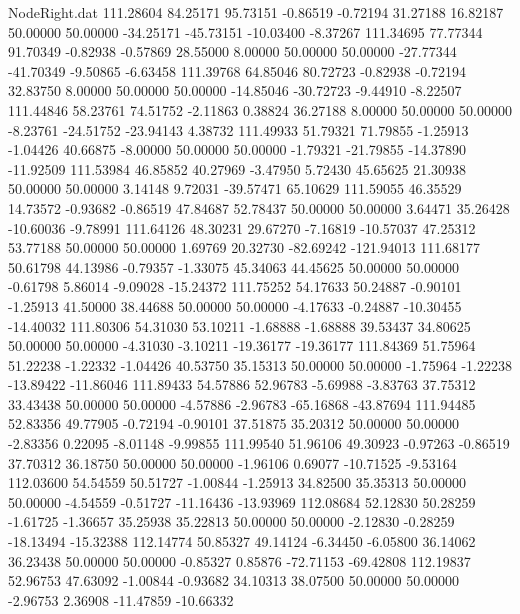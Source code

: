 \begin{filecontents}{NodeRight.dat}
 111.28604   84.25171   95.73151    -0.86519   -0.72194   31.27188   16.82187   50.00000   50.00000  -34.25171  -45.73151  -10.03400   -8.37267
 111.34695   77.77344   91.70349    -0.82938   -0.57869   28.55000    8.00000   50.00000   50.00000  -27.77344  -41.70349   -9.50865   -6.63458
 111.39768   64.85046   80.72723    -0.82938   -0.72194   32.83750    8.00000   50.00000   50.00000  -14.85046  -30.72723   -9.44910   -8.22507
 111.44846   58.23761   74.51752    -2.11863    0.38824   36.27188    8.00000   50.00000   50.00000   -8.23761  -24.51752  -23.94143    4.38732
 111.49933   51.79321   71.79855    -1.25913   -1.04426   40.66875   -8.00000   50.00000   50.00000   -1.79321  -21.79855  -14.37890  -11.92509
 111.53984   46.85852   40.27969    -3.47950    5.72430   45.65625   21.30938   50.00000   50.00000    3.14148    9.72031  -39.57471   65.10629
 111.59055   46.35529   14.73572    -0.93682   -0.86519   47.84687   52.78437   50.00000   50.00000    3.64471   35.26428  -10.60036   -9.78991
 111.64126   48.30231   29.67270    -7.16819  -10.57037   47.25312   53.77188   50.00000   50.00000    1.69769   20.32730  -82.69242 -121.94013
 111.68177   50.61798   44.13986    -0.79357   -1.33075   45.34063   44.45625   50.00000   50.00000   -0.61798    5.86014   -9.09028  -15.24372
 111.75252   54.17633   50.24887    -0.90101   -1.25913   41.50000   38.44688   50.00000   50.00000   -4.17633   -0.24887  -10.30455  -14.40032
 111.80306   54.31030   53.10211    -1.68888   -1.68888   39.53437   34.80625   50.00000   50.00000   -4.31030   -3.10211  -19.36177  -19.36177
 111.84369   51.75964   51.22238    -1.22332   -1.04426   40.53750   35.15313   50.00000   50.00000   -1.75964   -1.22238  -13.89422  -11.86046
 111.89433   54.57886   52.96783    -5.69988   -3.83763   37.75312   33.43438   50.00000   50.00000   -4.57886   -2.96783  -65.16868  -43.87694
 111.94485   52.83356   49.77905    -0.72194   -0.90101   37.51875   35.20312   50.00000   50.00000   -2.83356    0.22095   -8.01148   -9.99855
 111.99540   51.96106   49.30923    -0.97263   -0.86519   37.70312   36.18750   50.00000   50.00000   -1.96106    0.69077  -10.71525   -9.53164
 112.03600   54.54559   50.51727    -1.00844   -1.25913   34.82500   35.35313   50.00000   50.00000   -4.54559   -0.51727  -11.16436  -13.93969
 112.08684   52.12830   50.28259    -1.61725   -1.36657   35.25938   35.22813   50.00000   50.00000   -2.12830   -0.28259  -18.13494  -15.32388
 112.14774   50.85327   49.14124    -6.34450   -6.05800   36.14062   36.23438   50.00000   50.00000   -0.85327    0.85876  -72.71153  -69.42808
 112.19837   52.96753   47.63092    -1.00844   -0.93682   34.10313   38.07500   50.00000   50.00000   -2.96753    2.36908  -11.47859  -10.66332

\end{filecontents}
